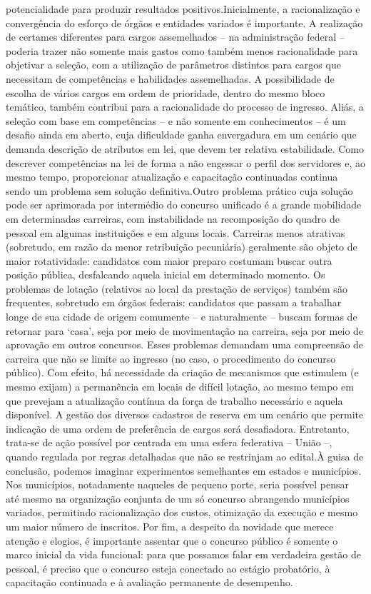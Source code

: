 \documentclass[
   article,       
   12pt,          
   oneside,       
   a4paper,       
   english,       
   brazil,        
   sumario=tradicional
   ]{abntex2}
\begin{document}
potencialidade para produzir resultados positivos.Inicialmente, a racionalização e convergência do esforço de órgãos e entidades variados é importante. A realização de certames diferentes para cargos assemelhados – na administração federal – poderia trazer não somente mais gastos como também menos racionalidade para objetivar a seleção, com a utilização de parâmetros distintos para cargos que necessitam de competências e habilidades assemelhadas. A possibilidade de escolha de vários cargos em ordem de prioridade, dentro do mesmo bloco temático, também contribui para a racionalidade do processo de ingresso. Aliás, a seleção com base em competências – e não somente em conhecimentos – é um desafio ainda em aberto, cuja dificuldade ganha envergadura em um cenário que demanda descrição de atributos em lei, que devem ter relativa estabilidade. Como descrever competências na lei de forma a não engessar o perfil dos servidores e, ao mesmo tempo, proporcionar atualização e capacitação continuadas continua sendo um problema sem solução definitiva.Outro problema prático cuja solução pode ser aprimorada por intermédio do concurso unificado é a grande mobilidade em determinadas carreiras, com instabilidade na recomposição do quadro de pessoal em algumas instituições e em alguns locais. Carreiras menos atrativas (sobretudo, em razão da menor retribuição pecuniária) geralmente são objeto de maior rotatividade: candidatos com maior preparo costumam buscar outra posição pública, desfalcando aquela inicial em determinado momento. Os problemas de lotação (relativos ao local da prestação de serviços) também são frequentes, sobretudo em órgãos federais: candidatos que passam a trabalhar longe de sua cidade de origem comumente – e naturalmente – buscam formas de retornar para ‘casa’, seja por meio de movimentação na carreira, seja por meio de aprovação em outros concursos. Esses problemas demandam uma compreensão de carreira que não se limite ao ingresso (no caso, o procedimento do concurso público). Com efeito, há necessidade da criação de mecanismos que estimulem (e mesmo exijam) a permanência em locais de difícil lotação, ao mesmo tempo em que prevejam a atualização contínua da força de trabalho necessário e aquela disponível. A gestão dos diversos cadastros de reserva em um cenário que permite indicação de uma ordem de preferência de cargos será desafiadora. Entretanto, trata-se de ação possível por centrada em uma esfera federativa – União –, quando regulada por regras detalhadas que não se restrinjam ao edital.À guisa de conclusão, podemos imaginar experimentos semelhantes em estados e municípios. Nos municípios, notadamente naqueles de pequeno porte, seria possível pensar até mesmo na organização conjunta de um só concurso abrangendo municípios variados, permitindo racionalização dos custos, otimização da execução e mesmo um maior número de inscritos. Por fim, a despeito da novidade que merece atenção e elogios, é importante assentar que o concurso público é somente o marco inicial da vida funcional: para que possamos falar em verdadeira gestão de pessoal, é preciso que o concurso esteja conectado ao estágio probatório, à capacitação continuada e à avaliação permanente de desempenho.
\end{document}
